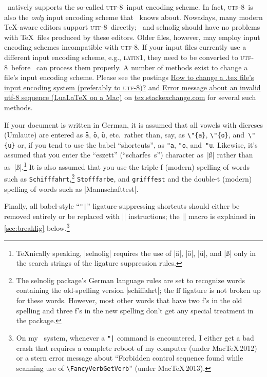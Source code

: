 \documentclass[11pt]{article}
\newcommand{\pkg}[1]{\textsf{#1}}
\newcommand{\cmmd}[1]{\texttt{\textbackslash #1}}
\newcommand\utf{\textsc{utf-8}}
\begin{document}
\LuaLaTeX\ natively supports the so-called \utf\ input encoding scheme. In fact, \utf\ is also the \emph{only} input encoding scheme that \LuaLaTeX\ knows about.  Nowadays, many modern \TeX-aware editors support \utf\ directly; \LuaLaTeX\  and \pkg{selnolig} should have no problems with \TeX\ files produced by these editors. Older files, however, may employ input encoding schemes incompatible with \utf. If your input files currently use a different input encoding scheme, e.g., \textsc{latin}1, they need to be converted to \utf\ before \LuaTeX\ can process them properly. A number of methods exist to change a file's input encoding scheme. Please see the postings \href{http://tex.stackexchange.com/q/87406/5001}{How to change a .tex file's input encoding system (preferably to \utf)?} and \href{http://tex.stackexchange.com/q/132638/5001}{Error message about an invalid utf-8 sequence (LuaLaTeX on a Mac)} on \href{http://tex.stackexchange.com/}{tex.stackexchange.com} for several such methods.

If your document is written in German, it is assumed that all vowels with diereses (Umlaute) are entered as \Verb|ä|, \Verb|ö|, \Verb|ü|, etc.\ rather than, say, as \Verb|\"{a}|, \Verb|\"{o}|, and~\Verb|\"{u}| or, if you tend to use the \pkg{babel} \enquote{shortcuts}, as \Verb|"a|, \Verb|"o|, and~\Verb|"u|. Likewise, it's assumed that you enter the \enquote{eszett} (\enquote{scharfes~s}) character as~|ß| rather than as~|\ss|.\footnote{\TeX nically speaking, |selnolig| requires the use of |ä|, |ö|, |ü|, and |ß| only in the search strings of the ligature suppression rules.} It is also assumed that you use the triple-f (modern) spelling of words such as \texttt{Schifffahrt},\footnote{The \pkg{selnolig} package's German language rules are set to recognize words containing the old-spelling version |schiffahrt|; the ff ligature is not broken up for these words. However, most other words that have two f's in the old spelling and three f's in the new spelling don't get any special treatment in the package.} \texttt{Stofffarbe}, and \texttt{grifffest} and the double-t (modern) spelling of words such as |Mannschafttest|.

Finally, all \pkg{babel}-style ``\Verb+"|+'' ligature-suppressing shortcuts should either be removed entirely or be replaced with |\breaklig| instructions; the |\breaklig| macro is explained in \cref{sec:breaklig} below.\footnote{On my \LuaLaTeX\ system, whenever a \Verb+"|+ command is encountered, I either get a bad crash that requires a complete reboot of my computer (under Mac\TeX\,2012) or a stern error message about \enquote{Forbidden control sequence found while scanning use of \cmmd{FancyVerbGetVerb}} (under Mac\TeX\,2013).}
\end{document}
